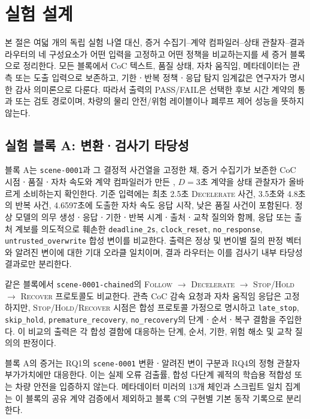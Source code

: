 \section{실험 설계}
\label{sec:experiments}

본 절은 여덟 개의 독립 실험 나열 대신, 증거 수집기--계약 컴파일러--상태 관찰자--결과 라우터의 네 구성요소가 어떤 입력을 고정하고 어떤 정책을 비교하는지를 세 증거 블록으로 정리한다. 모든 블록에서 CoC 텍스트, 품질 상태, 자차 움직임, 메타데이터는 관측 또는 도출 입력으로 보존하고, 기한ㆍ반복 정책ㆍ응답 탐지 임계값은 연구자가 명시한 감사 의미론으로 다룬다. 따라서 출력의 PASS/FAIL은 선택한 후보 시간 계약의 통과 또는 검토 경로이며, 차량의 물리 안전/위험 레이블이나 폐루프 제어 성능을 뜻하지 않는다.

\subsection{실험 블록 A: 변환·검사기 타당성}
\label{sec:exp-block-a}

블록 A는 \texttt{scene-0001}과 그 결정적 사건열을 고정한 채, 증거 수집기가 보존한 CoC 시점ㆍ품질ㆍ자차 속도와 계약 컴파일러가 만든 \preserve, $D=3$초 계약을 상태 관찰자가 올바르게 소비하는지 확인한다. 기준 입력에는 최초 2.5초 \textsc{Decelerate} 사건, 3.5초와 4.8초의 반복 사건, 4.6597초에 도출한 자차 속도 응답 시작, 낮은 품질 사건이 포함된다. 정상 모델의 의무 생성ㆍ응답ㆍ기한ㆍ반복 시계ㆍ출처ㆍ교착 질의와 함께, 응답 또는 출처 계보를 의도적으로 훼손한 \texttt{deadline\_2s}, \texttt{clock\_reset}, \texttt{no\_response}, \texttt{untrusted\_overwrite} 합성 변이를 비교한다. 출력은 정상 및 변이별 질의 판정 벡터와 알려진 변이에 대한 기대 오라클 일치이며, 결과 라우터는 이를 검사기 내부 타당성 결과로만 분리한다.

같은 블록에서 \texttt{scene-0001-chained}의 \textsc{Follow} $\rightarrow$ \textsc{Decelerate} $\rightarrow$ \textsc{Stop/Hold} $\rightarrow$ \textsc{Recover} 프로토콜도 비교한다. 관측 CoC 감속 요청과 자차 움직임 응답은 고정하지만, \textsc{Stop/Hold/Recover} 시점은 합성 프로토콜 가정으로 명시하고 \texttt{late\_stop}, \texttt{skip\_hold}, \texttt{premature\_recovery}, \texttt{no\_recovery}의 단계ㆍ순서ㆍ복구 결함을 주입한다. 이 비교의 출력은 각 합성 결함에 대응하는 단계, 순서, 기한, 위험 해소 및 교착 질의의 판정이다.

블록 A의 증거는 RQ1의 \texttt{scene-0001} 변환ㆍ알려진 변이 구분과 RQ4의 정형 관찰자 부가가치에만 대응한다. 이는 실제 오류 검출률, 합성 다단계 궤적의 학습용 적합성 또는 차량 안전을 입증하지 않는다. 메타데이터 미러의 13개 체인과 스크립트 일치 집계는 이 블록의 공유 계약 검증에서 제외하고 블록 C의 구현별 기본 동작 기록으로 분리한다.

